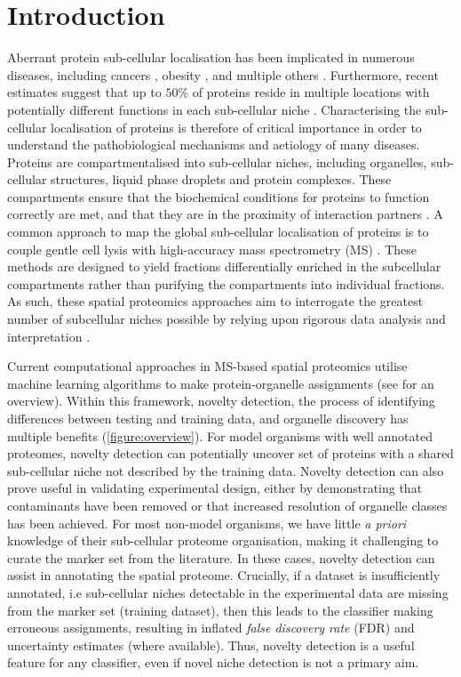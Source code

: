 \documentclass[12pt,english]{article}
\begin{document}
\section{Introduction}
Aberrant protein sub-cellular localisation has been implicated in numerous diseases, including cancers \citep{Kau:2004}, obesity \citep{Siljee:2018}, and multiple others \citep{Laurila:2009}. Furthermore, recent estimates suggest that up to $50\%$ of proteins reside in multiple locations with potentially different functions in each sub-cellular niche \citep{hyper, Thul:2017}. Characterising the sub-cellular localisation of proteins is therefore of critical importance in order to understand the pathobiological mechanisms and aetiology of many diseases. Proteins are compartmentalised into sub-cellular niches, including organelles, sub-cellular structures, liquid phase droplets and protein complexes. These compartments ensure that the biochemical conditions for proteins to function correctly are met, and that they are in the proximity of interaction partners \citep{Gibson:2009}. A common approach to map the global sub-cellular localisation of proteins is to couple gentle cell lysis with high-accuracy mass spectrometry (MS) \citep{hyper, Mulvey:2017, DC:2018, Orre:2019}. These methods are designed to yield fractions differentially enriched in the subcellular compartments rather than purifying the compartments into individual fractions. As such, these spatial proteomics approaches aim to interrogate the greatest number of subcellular niches possible by relying upon rigorous data analysis and interpretation \citep{Gatto:2010, Gatto:2014b}.

Current computational approaches in MS-based spatial proteomics utilise machine learning algorithms to make protein-organelle assignments (see \cite{Gatto:2014b} for an overview). Within this framework, novelty detection, the process of identifying differences between testing and training data, and organelle discovery has multiple benefits (\ref{figure:overview}). For model organisms with well annotated proteomes, novelty detection can potentially uncover set of proteins with a shared sub-cellular niche not described by the training data. Novelty detection can also prove useful in validating experimental design, either by demonstrating that contaminants have been removed or that increased resolution of organelle classes has been achieved. For most non-model organisms, we have little \textit{a priori} knowledge of their sub-cellular proteome organisation, making it challenging to curate the marker set from the literature. In these cases, novelty detection can assist in annotating the spatial proteome.  Crucially, if a dataset is insufficiently annotated, i.e sub-cellular niches detectable in the experimental data are missing from the marker set (training dataset), then this leads to the classifier making erroneous assignments, resulting in inflated \textit{false discovery rate} (FDR) and uncertainty estimates (where available). Thus, novelty detection is a useful feature for any classifier, even if novel niche detection is not a primary aim.
\end{document}
